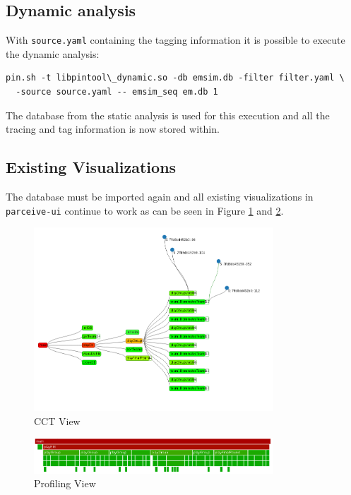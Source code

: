 \subsection {Dynamic analysis}

With \texttt{source.yaml} containing the tagging information it is possible to execute the dynamic analysis:

\begin{lstlisting}[style=BashInputStyle]
pin.sh -t libpintool\_dynamic.so -db emsim.db -filter filter.yaml \ 
  -source source.yaml -- emsim_seq em.db 1
\end{lstlisting}

The database from the static analysis is used for this execution and all the tracing and tag information is now stored within.

\subsection {Existing Visualizations}

The database must be imported again and all existing visualizations in \texttt{parceive-ui} continue to work as can be seen in Figure \ref{cap1:cct} and \ref{cap1:profiling}.

\begin{figure}[!ht]
	\centering
	\includegraphics[width=0.8\textwidth]{cct}
	\caption{CCT View}
	\label{cap1:cct}
\end{figure}

\begin{figure}[!ht]
	\centering
	\includegraphics[width=0.8\textwidth]{profiling}
	\caption{Profiling View}
	\label{cap1:profiling}
\end{figure}

